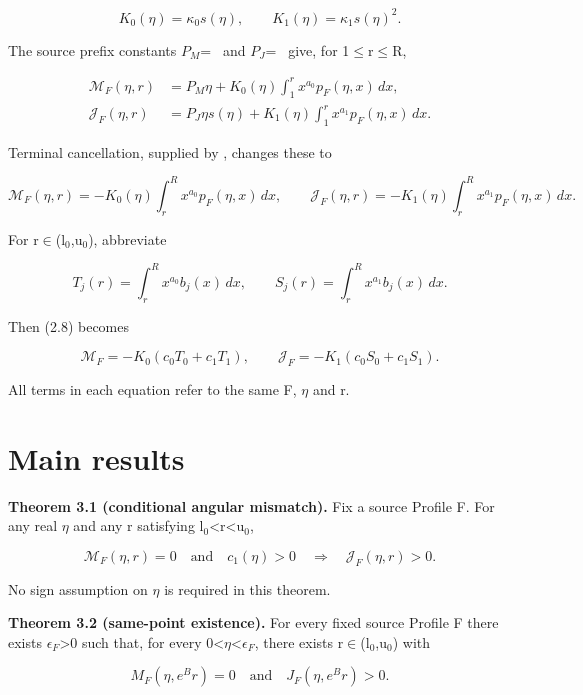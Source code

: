 \documentclass[11pt,a4paper]{article}
\begin{document}
\[
K_0(\eta)=\kappa_0 s(\eta),\qquad K_1(\eta)=\kappa_1 s(\eta)^2.
\]

The source prefix constants \(P_M\)=\texttt{\allowbreak\ } and \(P_J\)=\texttt{\allowbreak\ } give, for 1\ensuremath{\le}r\ensuremath{\le}R,

\[
\begin{aligned}
\mathcal M_F(\eta,r)&=P_M\eta+K_0(\eta)\int_1^r x^{a_0}p_F(\eta,x)\,dx,\\
\mathcal J_F(\eta,r)&=P_J\eta s(\eta)+K_1(\eta)\int_1^r x^{a_1}p_F(\eta,x)\,dx.
\end{aligned} \tag{2.7}
\]

Terminal cancellation, supplied by , changes these to

\[
\mathcal M_F(\eta,r)=-K_0(\eta)\int_r^R x^{a_0}p_F(\eta,x)\,dx,\qquad
\mathcal J_F(\eta,r)=-K_1(\eta)\int_r^R x^{a_1}p_F(\eta,x)\,dx. \tag{2.8}
\]

For r\ensuremath{\in}(l\ensuremath{{}_0},u\ensuremath{{}_0}), abbreviate

\[
T_j(r)=\int_r^R x^{a_0}b_j(x)\,dx,\qquad
S_j(r)=\int_r^R x^{a_1}b_j(x)\,dx. \tag{2.9}
\]

Then (2.8) becomes

\[
\mathcal M_F=-K_0(c_0T_0+c_1T_1),\qquad
\mathcal J_F=-K_1(c_0S_0+c_1S_1). \tag{2.10}
\]

All terms in each equation refer to the same F, \ensuremath{\eta} and r.

\section{Main results}

\textbf{Theorem 3.1 (conditional angular mismatch).} Fix a source Profile F. For any real \ensuremath{\eta} and any r satisfying l\ensuremath{{}_0}<r<u\ensuremath{{}_0},

\[
\mathcal M_F(\eta,r)=0\quad\text{and}\quad c_1(\eta)>0
\quad\Longrightarrow\quad\mathcal J_F(\eta,r)>0.
\]

No sign assumption on \ensuremath{\eta} is required in this theorem.

\textbf{Theorem 3.2 (same-point existence).} For every fixed source Profile F there exists \(\epsilon _F\)>0 such that, for every 0<\ensuremath{\eta}<\(\epsilon _F\), there exists r\ensuremath{\in}(l\ensuremath{{}_0},u\ensuremath{{}_0}) with

\[
M_F(\eta,e^B r)=0\quad\text{and}\quad J_F(\eta,e^B r)>0. \tag{3.1}
\]
\end{document}
